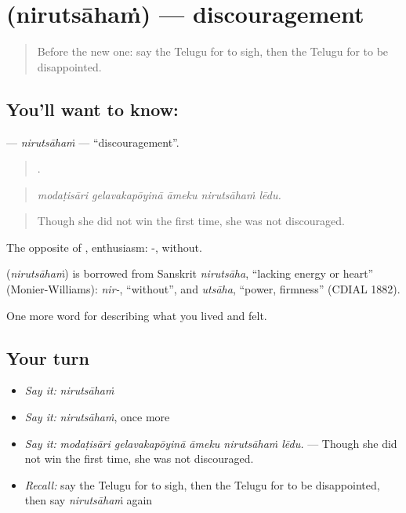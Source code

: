 \section[\texorpdfstring{\te{నిరుత్సాహం} (nirutsāhaṁ)}{నిరుత్సాహం (nirutsāhaṁ)}]{ (nirutsāhaṁ) — discouragement}

\label{lesson:TE-C502-nirutsaham}



\begin{quote}
Before the new one: say the Telugu for to sigh, then the Telugu for to be disappointed.
\end{quote}

\subsection*{You'll want to know: }
\textbf{} — \emph{nirutsāhaṁ} — \textquotedblleft{}discouragement\textquotedblright{}.

\begin{quote}
    .
\end{quote}

\begin{quote}
\emph{modaṭisāri gelavakapōyinā āmeku nirutsāhaṁ lēdu.}
\end{quote}

\begin{quote}
Though she did not win the first time, she was not discouraged.
\end{quote}

The opposite of , enthusiasm: -, without.

\begin{cousinweb}
\textbf{} (\emph{nirutsāhaṁ}) is borrowed from Sanskrit \emph{nirutsāha}, \textquotedblleft{}lacking energy or heart\textquotedblright{} (Monier-Williams): \emph{nir-}, \textquotedblleft{}without\textquotedblright{}, and \emph{utsāha}, \textquotedblleft{}power, firmness\textquotedblright{} (CDIAL 1882).
\end{cousinweb}

\begin{grammarlens}[title={What you've built}]
One more word for describing what you lived and felt.
\end{grammarlens}

\subsection*{Your turn}
\begin{itemize}
\raggedright
  \item \emph{Say it:} \emph{nirutsāhaṁ}
  \item \emph{Say it:} \emph{nirutsāhaṁ}, once more
  \item \emph{Say it:} \emph{modaṭisāri gelavakapōyinā āmeku nirutsāhaṁ lēdu.} — Though she did not win the first time, she was not discouraged.
  \item \emph{Recall:} say the Telugu for to sigh, then the Telugu for to be disappointed, then say \emph{nirutsāhaṁ} again
\end{itemize}

